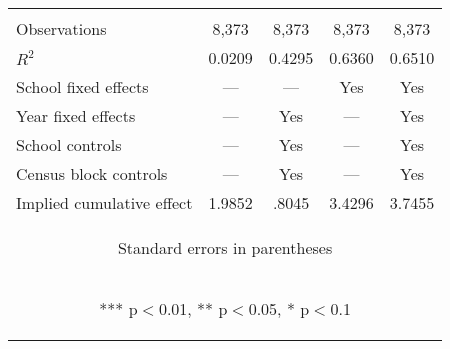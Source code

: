 \documentclass[11pt, a4paper]{article}
\begin{document}
\begin{table}
\begin{center}
{\begin{tabular}{lcccc}
\vspace{4pt} & \begin{footnotesize}\end{footnotesize} & \begin{footnotesize}\end{footnotesize} & \begin{footnotesize}\end{footnotesize} & \begin{footnotesize}\end{footnotesize} \\
Observations & 8,373 & 8,373 & 8,373 & 8,373 \\
$R^2$ & 0.0209 & 0.4295 & 0.6360 & 0.6510 \\
School fixed effects & --- & --- & Yes & Yes \\
Year fixed effects & --- & Yes & --- & Yes \\
School controls & --- & Yes & --- & Yes \\
Census block controls & --- & Yes & --- & Yes \\
 Implied cumulative effect & 1.9852 & .8045 & 3.4296 & 3.7455 \\ \hline
\multicolumn{5}{c}{\begin{footnotesize} Standard errors in parentheses\end{footnotesize}} \\
\multicolumn{5}{c}{\begin{footnotesize} *** p$<$0.01, ** p$<$0.05, * p$<$0.1\end{footnotesize}} \\
\end{tabular} }
\end{center}
\end{table}
\end{document}
